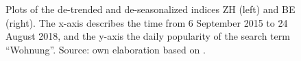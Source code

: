 \documentclass[11pt]{article}
\begin{document}
\begin{figure}[p!]
	\begin{minipage}{.5\linewidth}
		\centering
	\end{minipage}	\begin{minipage}{.5\linewidth}
		\centering
	\end{minipage}
	\caption{Plots of the de-trended and de-seasonalized indices ZH (left) and BE (right). The x-axis describes the time from 6 September 2015 to 24 August 2018, and the y-axis the daily popularity of the search term ``Wohnung''. Source: own elaboration based on \cite{googleT}.}
	\label{fig:error}
\end{figure}
\end{document}

